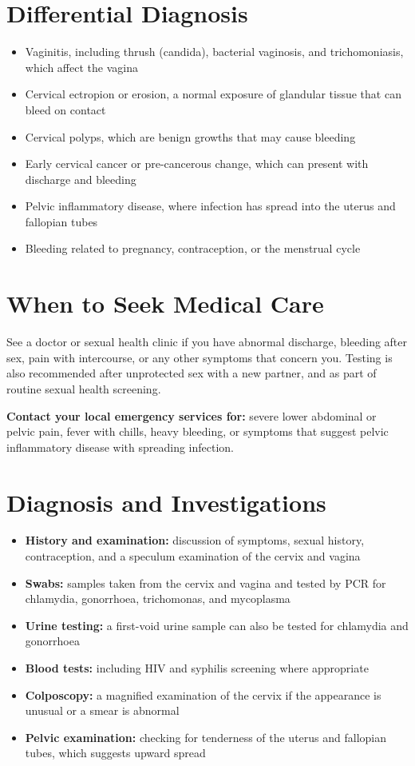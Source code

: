 \section*{Differential Diagnosis}
\begin{itemize}
    \item Vaginitis, including thrush (candida), bacterial vaginosis, and trichomoniasis, which affect the vagina
    \item Cervical ectropion or erosion, a normal exposure of glandular tissue that can bleed on contact
    \item Cervical polyps, which are benign growths that may cause bleeding
    \item Early cervical cancer or pre-cancerous change, which can present with discharge and bleeding
    \item Pelvic inflammatory disease, where infection has spread into the uterus and fallopian tubes
    \item Bleeding related to pregnancy, contraception, or the menstrual cycle
\end{itemize}

\section*{When to Seek Medical Care}
See a doctor or sexual health clinic if you have abnormal discharge, bleeding after sex, pain with intercourse, or any other symptoms that concern you. Testing is also recommended after unprotected sex with a new partner, and as part of routine sexual health screening.

\textbf{Contact your local emergency services for:} severe lower abdominal or pelvic pain, fever with chills, heavy bleeding, or symptoms that suggest pelvic inflammatory disease with spreading infection.

\section*{Diagnosis and Investigations}
\begin{itemize}
    \item \textbf{History and examination:} discussion of symptoms, sexual history, contraception, and a speculum examination of the cervix and vagina
    \item \textbf{Swabs:} samples taken from the cervix and vagina and tested by PCR for chlamydia, gonorrhoea, trichomonas, and mycoplasma
    \item \textbf{Urine testing:} a first-void urine sample can also be tested for chlamydia and gonorrhoea
    \item \textbf{Blood tests:} including HIV and syphilis screening where appropriate
    \item \textbf{Colposcopy:} a magnified examination of the cervix if the appearance is unusual or a smear is abnormal
    \item \textbf{Pelvic examination:} checking for tenderness of the uterus and fallopian tubes, which suggests upward spread
\end{itemize}


